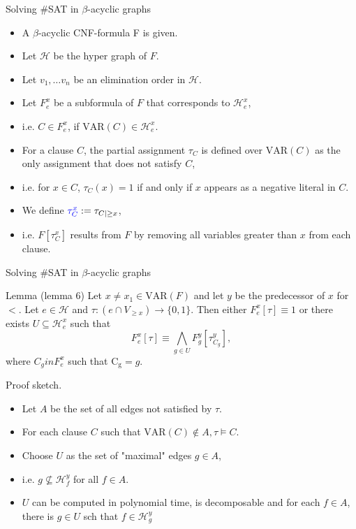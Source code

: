 \begin{frame}[t]{Solving \#SAT in $\beta$-acyclic graphs}
	\begin{itemize}[<+->]
	\item A $\beta$-acyclic CNF-formula F is given.
	\item Let $\mathcal{H}$ be the hyper graph of $F$.
	\item Let $v_1, \dots v_n$ be an elimination order in $\mathcal{H}$.
	\item Let {\color{blue}$F^x_e$} be a subformula of $F$ that corresponds to $\mathcal{H}^x_e$,
	\item[]\hspace{1cm}i.e. $C \in F^x_e$, if $\mathrm{VAR}(C) \in \mathcal{H}^x_e$.
	\item For a clause $C$, the partial assignment {\color{blue}$\tau_C$} is defined over $\mathrm{VAR}(C)$ as the only assignment that does not satisfy $C$,
	\item[]\hspace{1cm}i.e. for $x \in C$, $\tau_C(x) = 1$ if and only if $x$ appears as a negative literal in $C$.
	\item We define ${\color{blue}\tau^x_C} := \tau_{C|\geq x}$,
	\item[]\hspace{1cm}i.e. $F[\tau^x_C]$ results from $F$ by removing all variables greater than $x$ from each clause.
	\end{itemize}
\end{frame}
\begin{frame}[t]{Solving \#SAT in $\beta$-acyclic graphs}
	\begin{block}{Lemma (lemma 6)}
		Let $x \neq x_1 \in \mathrm{VAR}(F)$ and let $y$ be the predecessor of $x$ for $<$.  Let $e \in \mathcal{H}$ and $\tau : (e \cap V_{\geq x}) \rightarrow \{0, 1\}$. Then either $F^x_e[\tau] \equiv 1$ or there exists $U \subseteq \mathcal{H}^x_e$ such that 
		$$ F^x_e[\tau] \equiv \bigwedge\limits_{g \in U} F^y_g[\tau^y_{C_g}],$$
		where $C_g in F^x_e$ such that $\mathrm{C_g} = g$.
	\end{block}
	Proof sketch.
	\pause\begin{itemize}[<+->]
		\item Let $A$ be the set of all edges not satisfied by $\tau$. 
		\item For each clause $C$ such that $\mathrm{VAR}(C) \notin A, \tau \models C$.
		\item Choose $U$ as the set of "maximal" edges $g \in A$,
		\item[]\hspace{1cm}i.e. $g \not \subseteq \mathcal{H}^y_f$ for all $f \in A$.
		\item $U$ can be computed in polynomial time, is decomposable and for each $f \in A$, there is $g \in U$ sch that $f \in \mathcal{H}^y_g$
	\end{itemize}
\end{frame}

